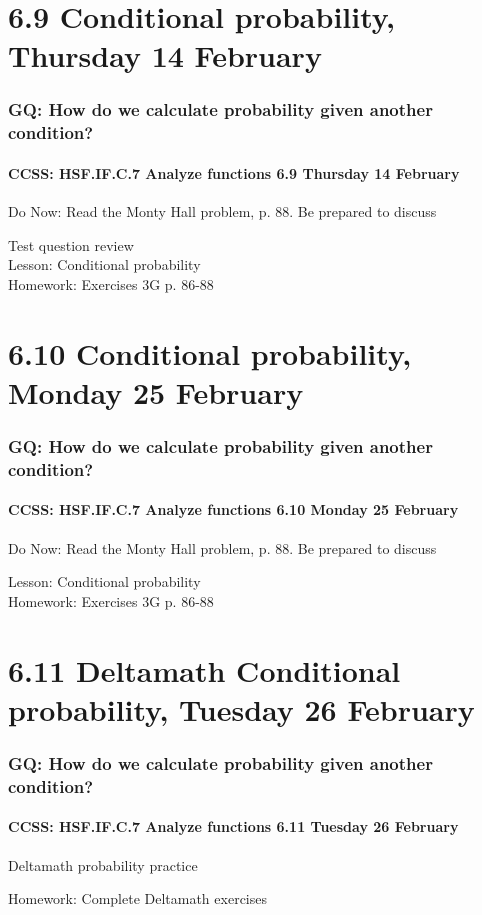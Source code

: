 \documentclass{beamer}
\begin{document}
\section{6.9 Conditional probability, Thursday 14 February}
  \frame
  {
    \frametitle{GQ: How do we calculate probability given another condition?}
    \framesubtitle{CCSS: HSF.IF.C.7 Analyze functions \hfill \alert{6.9 Thursday 14 February}}

    \begin{block}{Do Now: Read the Monty Hall problem, p. 88. Be prepared to discuss}
    \end{block}
    Test question review\\
    Lesson: Conditional probability\\[0.5cm]
    Homework: Exercises 3G p. 86-88
  }

\section{6.10 Conditional probability, Monday 25 February}
  \frame
  {
    \frametitle{GQ: How do we calculate probability given another condition?}
    \framesubtitle{CCSS: HSF.IF.C.7 Analyze functions \hfill \alert{6.10 Monday 25 February}}

    \begin{block}{Do Now: Read the Monty Hall problem, p. 88. Be prepared to discuss}
    \end{block}
    Lesson: Conditional probability\\[0.5cm]
    Homework: Exercises 3G p. 86-88
  }

\section{6.11 Deltamath Conditional probability, Tuesday 26 February}
  \frame
  {
    \frametitle{GQ: How do we calculate probability given another condition?}
    \framesubtitle{CCSS: HSF.IF.C.7 Analyze functions \hfill \alert{6.11 Tuesday 26 February}}

    \begin{block}{Deltamath probability practice}
    \end{block}
    Homework: Complete Deltamath exercises
  }
\end{document}
